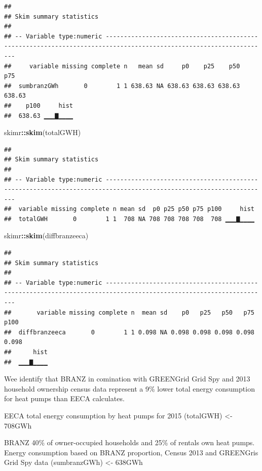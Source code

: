 \documentclass[]{article}
\newenvironment{Shaded}{\begin{snugshade}}{\end{snugshade}}
\newcommand{\KeywordTok}[1]{\textcolor[rgb]{0.13,0.29,0.53}{\textbf{#1}}}
\newcommand{\OperatorTok}[1]{\textcolor[rgb]{0.81,0.36,0.00}{\textbf{#1}}}
\newcommand{\NormalTok}[1]{#1}
\begin{document}
\begin{verbatim}
## 
## Skim summary statistics
## 
## -- Variable type:numeric -------------------------------------------------------------------------------------------------------------------
##     variable missing complete n   mean sd     p0    p25    p50    p75
##  sumbranzGWh       0        1 1 638.63 NA 638.63 638.63 638.63 638.63
##    p100     hist
##  638.63 ▁▁▁▇▁▁▁▁
\end{verbatim}

\begin{Shaded}
\begin{Highlighting}[]
\NormalTok{skimr}\OperatorTok{::}\KeywordTok{skim}\NormalTok{(totalGWH)}
\end{Highlighting}
\end{Shaded}

\begin{verbatim}
## 
## Skim summary statistics
## 
## -- Variable type:numeric -------------------------------------------------------------------------------------------------------------------
##  variable missing complete n mean sd  p0 p25 p50 p75 p100     hist
##  totalGWH       0        1 1  708 NA 708 708 708 708  708 ▁▁▁▇▁▁▁▁
\end{verbatim}

\begin{Shaded}
\begin{Highlighting}[]
\NormalTok{skimr}\OperatorTok{::}\KeywordTok{skim}\NormalTok{(diffbranzeeca)}
\end{Highlighting}
\end{Shaded}

\begin{verbatim}
## 
## Skim summary statistics
## 
## -- Variable type:numeric -------------------------------------------------------------------------------------------------------------------
##       variable missing complete n  mean sd    p0   p25   p50   p75  p100
##  diffbranzeeca       0        1 1 0.098 NA 0.098 0.098 0.098 0.098 0.098
##      hist
##  ▁▁▁▇▁▁▁▁
\end{verbatim}

Wee identify that BRANZ in comination with GREENGrid Grid Spy and 2013
household ownership census data represent a 9\% lower total energy
consumption for heat pumps than EECA calculates.

EECA total energy consumption by heat pumps for 2015 (totalGWH)
\textless{}- 708GWh

BRANZ 40\% of owner-occupied households and 25\% of rentals own heat
pumps. Energy consumption based on BRANZ proportion, Census 2013 and
GREENGris Grid Spy data (sumbranzGWh) \textless{}- 638GWh
\end{document}
